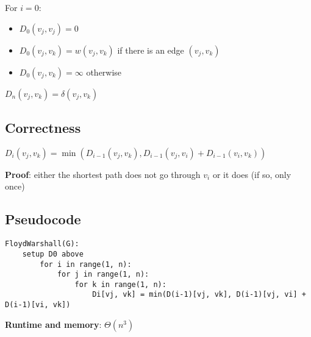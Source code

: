 \documentclass[11pt]{article}
\begin{document}
For \(i = 0\):
\begin{itemize}
\item \(D_{0}(v_{j}, v_{j}) = 0\)
\item \(D_{0}(v_{j}, v_{k}) = w(v_{j}, v_{k})\) if there is an edge \((v_{j}, v_{k})\)
\item \(D_{0}(v_{j}, v_{k}) = \infty\) otherwise
\end{itemize}

\(D_{n}(v_{j}, v_{k}) = \delta(v_{j}, v_{k})\)
\subsection{Correctness}
\label{sec:orge49d229}
\(D_{i}(v_{j}, v_{k}) = \min(D_{i-1}(v_{j}, v_{k}), D_{i-1}(v_{j}, v_{i}) + D_{i-1}(v_{i}, v_{k}))\)

\textbf{Proof}: either the shortest path does not go through \(v_{i}\) or it does (if so, only once)
\subsection{Pseudocode}
\label{sec:orgc582ee7}
\begin{verbatim}
FloydWarshall(G):
    setup D0 above
        for i in range(1, n):
            for j in range(1, n):
                for k in range(1, n):
                    Di[vj, vk] = min(D(i-1)[vj, vk], D(i-1)[vj, vi] + D(i-1)[vi, vk])
\end{verbatim}

\textbf{Runtime and memory}: \(\Theta(n^{3})\)
\end{document}
